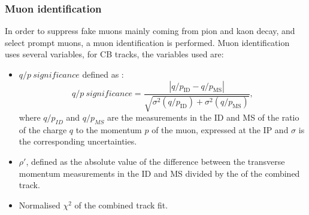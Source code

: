 \subsubsection{Muon identification}
\label{chap2:Objects:Muon:ID}
In order to suppress fake muons mainly coming from pion and kaon decay, and select prompt muons, a muon identification is performed. Muon identification uses several variables, for CB tracks, the variables used are:
\begin{itemize}
    \item $q/p \ significance$ defined as : 
    \begin{equation}
        q / p \ significance=\frac{\left|q / p_{\mathrm{ID}}-q / p_{\mathrm{MS}}\right|}{\sqrt{\sigma^{2}\left(q / p_{\mathrm{ID}}\right)+\sigma^{2}\left(q / p_{\mathrm{MS}}\right)}},
    \end{equation}
    where $q/p_{ID}$ and $q/p_{MS}$ are the measurements in the ID and MS of the ratio of the charge $q$ to the momentum $p$ of the muon, expressed at the IP and $\sigma$ is the corresponding uncertainties. 
    \item $\rho'$, defined as the absolute value of the difference between the transverse momentum measurements in the ID and MS divided by the \pT of the combined track.
    \item Normalised $\chi^2$ of the combined track fit. 
\end{itemize}

